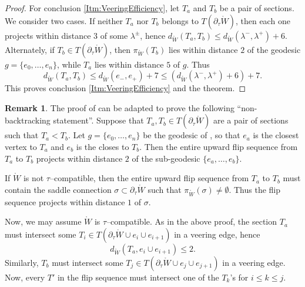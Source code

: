 \documentclass[11pt,letterpaper]{amsart}
\newcommand{\mr}{\mathring}
\newcommand{\bdy}{\partial} %
\newcommand{\psub}{\mr W}
\numberwithin{equation}{section}
\theoremstyle{definition}
\newtheorem{remark}[theorem]{Remark}
\begin{document}
\begin{proof}
For conclusion \eqref{Itm:VeeringEfficiency}, let $T_a$ and $T_b$ be a pair of sections. We consider two cases. If neither $T_a$ nor $T_b$ belongs to $T(\bdy_\tau \psub)$, then each one projects within distance $3$ of some $\lambda^\pm$, hence $d_{\psub}(T_a, T_b) \leq d_{\psub}(\lambda^-, \lambda^+) + 6$. Alternately, if $T_b  \in T(\bdy_\tau \psub)$, then $\pi_{\psub}(T_b)$ lies within distance $2$ of the geodesic $g = \{e_0, \ldots, e_n\}$, while $T_a$ lies within distance $5$ of $g$. Thus
\[
d_{\psub}(T_a, T_b) \leq d_{\psub}(e_-, e_+) + 7 \leq \left( d_{\psub}(\lambda^-, \lambda^+) + 6 \right) +7.
\]
 This proves conclusion \eqref{Itm:VeeringEfficiency} and the theorem.
\end{proof}

\begin{remark}\label{Rem:NonBacktracking}
The proof of  can be adapted to prove the following ``non-backtracking statement''. Suppose that $T_a, T_b \in T(\bdy_\tau \psub)$ are a pair of sections such that $T_a < T_b$. Let $g = \{e_0, \ldots, e_n\}$ be the geodesic of , so that $e_a$ is the closest vertex to $T_a$ and $e_b$ is the closes to $T_b$. Then the entire upward flip sequence from $T_a$ to $T_b$ projects within distance $2$ of the sub-geodesic $\{e_a, \ldots, e_b\}$.
 
If $\psub$ is not $\tau$--compatible, then  the entire upward flip sequence from $T_a$ to $T_b$ must contain the saddle connection  
$\sigma \subset \bdy_\tau \psub$ such that $\pi_{\psub}(\sigma) \neq \emptyset$. Thus the flip sequence projects within distance $1$ of $\sigma$.

Now, we may assume $\psub$ is $\tau$--compatible. As in the above proof, the section $T_a$ must intersect some $T_i \in T(\bdy_\tau \psub \cup e_i \cup e_{i+1})$ in a veering edge, hence 
\[ d_{\psub}(T_a, e_i \cup e_{i+1}) \leq 2.\]
 Similarly, $T_b$ must intersect some 
$ T_j \in T(\bdy_\tau \psub \cup e_j \cup e_{j+1})$
  in a veering edge. Now, every $T'$ in the flip sequence must intersect one of the $T_k$'s for $i \leq k \leq j$.
\end{remark}
\end{document}

